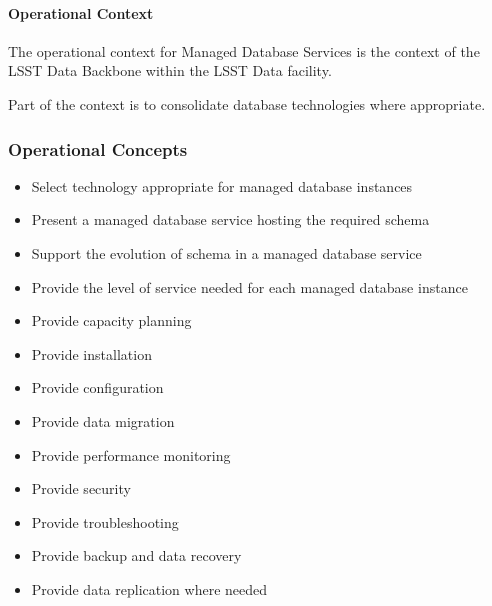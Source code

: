 \paragraph{Operational Context}

The operational context for Managed Database Services is the context
of the LSST Data Backbone within the LSST Data facility.

Part of the context is to consolidate database technologies where
appropriate.

\subsubsection{Operational Concepts}

\begin{itemize}

\item Select technology appropriate for managed database instances
\item Present a managed database service hosting the required schema
\item Support the evolution of schema in a managed database service
\item Provide the level of service needed for each managed database instance
\item Provide capacity planning
\item Provide installation
\item Provide configuration
\item Provide data migration
\item Provide performance monitoring
\item Provide security
\item Provide troubleshooting
\item Provide backup and data recovery
\item Provide data replication where needed

\end{itemize}